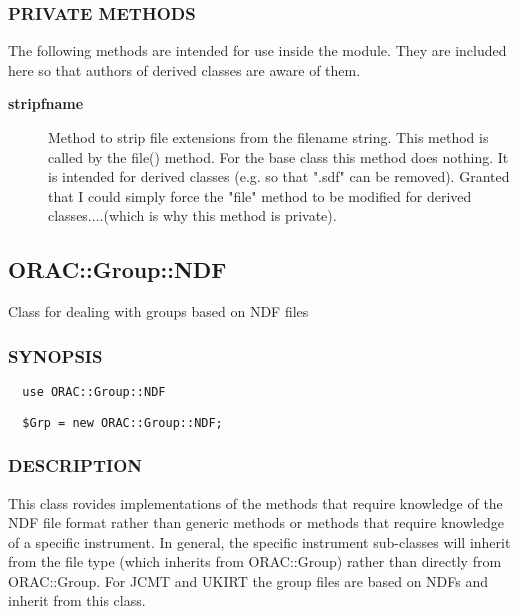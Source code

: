 \subsubsection*{PRIVATE METHODS\label{ORAC::Group_PRIVATE_METHODS}}

The following methods are intended for use inside the module.
They are included here so that authors of derived classes are 
aware of them.

\begin{description}
\item[\textbf{stripfname}] \mbox{}

Method to strip file extensions from the filename string. This method
is called by the file() method. For the base class this method
does nothing. It is intended for derived classes (e.g. so that ".sdf"
can be removed). Granted that I could simply force the "file" method
to be modified for derived classes....(which is why this method is
private).

\end{description}


\subsection{ORAC::Group::NDF\label{ORAC::Group::NDF}}

Class for dealing with groups based on NDF files

\subsubsection*{SYNOPSIS\label{ORAC::Group::NDF_SYNOPSIS}}\begin{verbatim}
  use ORAC::Group::NDF
\end{verbatim}
\begin{verbatim}
  $Grp = new ORAC::Group::NDF;
\end{verbatim}
\subsubsection*{DESCRIPTION\label{ORAC::Group::NDF_DESCRIPTION}}

This class rovides implementations of the methods that require
knowledge of the NDF file format rather than generic methods or
methods that require knowledge of a specific instrument.  In general,
the specific instrument sub-classes will inherit from the file type
(which inherits from ORAC::Group) rather than directly from
ORAC::Group. For JCMT and UKIRT the group files are based on NDFs and
inherit from this class.



